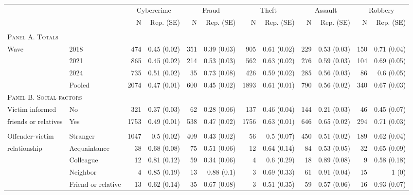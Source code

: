 \begin{tabular}{p{1.2in}p{1.2in}rrrrrrrrrr}
	\toprule
	&  & \multicolumn{2}{c}{Cybercrime    } & \multicolumn{2}{c}{Fraud    } & \multicolumn{2}{c}{Theft    } & \multicolumn{2}{c}{Assault    } & \multicolumn{2}{c}{Robbery    } \\ 
	\cmidrule(lr){3-4} \cmidrule(lr){5-6} \cmidrule(lr){7-8} \cmidrule(lr){9-10} \cmidrule(lr){11-12}
	&     & N & Rep. (SE) & N  & Rep. (SE)  & N   & Rep. (SE)   & N    & Rep. (SE)    & N     & Rep. (SE)     \\ 
\vspace{1.5pt}\\
	\multicolumn{12}{l}{\textsc{Panel A. Totals}} \\
Wave & 2018 & 474 & 0.45 (0.02) & 351 & 0.39 (0.03) & 905 & 0.61 (0.02) & 229 & 0.53 (0.03) & 150 & 0.71 (0.04) \\ 
 & 2021 & 865 & 0.45 (0.02) & 214 & 0.53 (0.03) & 562 & 0.63 (0.02) & 276 & 0.59 (0.03) & 104 & 0.69 (0.05) \\ 
 & 2024 & 735 & 0.51 (0.02) & 35 & 0.73 (0.08) & 426 & 0.59 (0.02) & 285 & 0.56 (0.03) & 86 & 0.6 (0.05) \\
 & Pooled & 2074 & 0.47 (0.01) & 600 & 0.45 (0.02) & 1893 & 0.61 (0.01) & 790 & 0.56 (0.02) & 340 & 0.67 (0.03) \\ 
 \midrule
			\multicolumn{12}{l}{\textsc{Panel B. Social factors}} \\
	Victim informed %
	& No & 321 & 0.37 (0.03) & 62 & 0.28 (0.06) & 137 & 0.46 (0.04) & 144 & 0.21 (0.03) & 46 & 0.45 (0.07) \\ 
	friends or relatives  & Yes & 1753 & 0.49 (0.01) & 538 & 0.47 (0.02) & 1756 & 0.63 (0.01) & 646 & 0.65 (0.02) & 294 & 0.71 (0.03) \\
	\vspace{1pt}\\
	Offender-victim %
	& Stranger & 1047 & 0.5 (0.02) & 409 & 0.43 (0.02) & 56 & 0.5 (0.07) & 450 & 0.51 (0.02) & 189 & 0.62 (0.04) \\ 
	relationship  & Acquaintance & 38 & 0.68 (0.08) & 75 & 0.51 (0.06) & 12 & 0.64 (0.14) & 84 & 0.53 (0.05) & 32 & 0.65 (0.09) \\ 
	& Colleague & 12 & 0.81 (0.12) & 59 & 0.34 (0.06) & 4 & 0.6 (0.29) & 18 & 0.89 (0.08) & 9 & 0.58 (0.18) \\ 
	& Neighbor & 4 & 0.85 (0.19) & 13 & 0.88 (0.1) & 3 & 0.69 (0.33) & 61 & 0.91 (0.04) & 15 & 1 (0) \\ 
	& Friend or relative & 13 & 0.62 (0.14) & 35 & 0.67 (0.08) & 3 & 0.51 (0.35) & 59 & 0.57 (0.06) & 16 & 0.93 (0.07) \\ 

\end{tabular}
